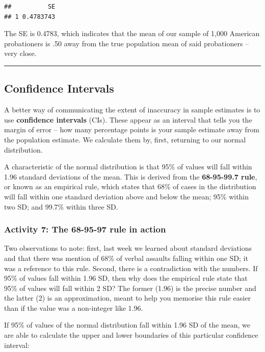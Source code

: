 \documentclass[
]{book}
\begin{document}
\begin{verbatim}
##          SE
## 1 0.4783743
\end{verbatim}

The SE is 0.4783, which indicates that the mean of our sample of 1,000 American probationers is .50 away from the true population mean of said probationers -- very close.

\begin{center}\rule{0.5\linewidth}{0.5pt}\end{center}

\hypertarget{confidence-intervals}{%
\subsection{Confidence Intervals}\label{confidence-intervals}}

A better way of communicating the extent of inaccuracy in sample estimates is to use \textbf{confidence intervals} (CIs). These appear as an interval that tells you the margin of error -- how many percentage points is your sample estimate away from the population estimate. We calculate them by, first, returning to our normal distribution.

A characteristic of the normal distribution is that 95\% of values will fall within 1.96 standard deviations of the mean. This is derived from the \textbf{68-95-99.7 rule}, or known as an empirical rule, which states that 68\% of cases in the distribution will fall within one standard deviation above and below the mean; 95\% within two SD; and 99.7\% within three SD.

\hypertarget{activity-7-the-68-95-97-rule-in-action}{%
\subsubsection{Activity 7: The 68-95-97 rule in action}\label{activity-7-the-68-95-97-rule-in-action}}

Two observations to note: first, last week we learned about standard deviations and that there was mention of 68\% of verbal assaults falling within one SD; it was a reference to this rule. Second, there is a contradiction with the numbers. If 95\% of values fall within 1.96 SD, then why does the empirical rule state that 95\% of values will fall within 2 SD? The former (1.96) is the precise number and the latter (2) is an approximation, meant to help you memorise this rule easier than if the value was a non-integer like 1.96.

If 95\% of values of the normal distribution fall within 1.96 SD of the mean, we are able to calculate the upper and lower boundaries of this particular confidence interval:
\end{document}
